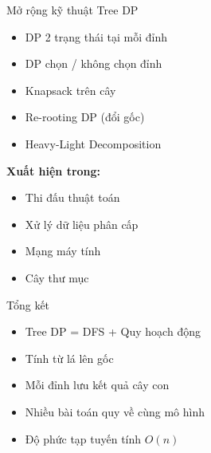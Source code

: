 \documentclass[aspectratio=169]{beamer}
\begin{document}
\begin{frame}{Mở rộng kỹ thuật Tree DP}
\begin{itemize}
    \item DP 2 trạng thái tại mỗi đỉnh
    \item DP chọn / không chọn đỉnh
    \item Knapsack trên cây
    \item Re-rooting DP (đổi gốc)
    \item Heavy-Light Decomposition
\end{itemize}

\vspace{6pt}
\textbf{Xuất hiện trong:}
\begin{itemize}
    \item Thi đấu thuật toán
    \item Xử lý dữ liệu phân cấp
    \item Mạng máy tính
    \item Cây thư mục
\end{itemize}
\end{frame}

\begin{frame}{Tổng kết}
\begin{itemize}
    \item Tree DP = DFS + Quy hoạch động
    \item Tính từ lá lên gốc
    \item Mỗi đỉnh lưu kết quả cây con
    \item Nhiều bài toán quy về cùng mô hình
    \item Độ phức tạp tuyến tính $O(n)$
\end{itemize}
\end{frame}

\end{document}
